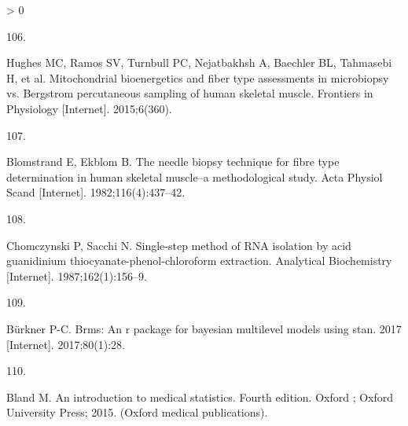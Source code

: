 \documentclass[twoside,10pt]{gihclass} %
\newlength{\cslhangindent}
\newlength{\csllabelwidth}
\newenvironment{CSLReferences}[3] %
 {%
  \setlength{\parindent}{0pt}
  \ifodd #1 \everypar{\setlength{\hangindent}{\cslhangindent}}\ignorespaces\fi
  \ifnum #2 > 0
  \setlength{\parskip}{#2\baselineskip}
  \fi
 }%
 {}
\newcommand{\CSLLeftMargin}[1]{\parbox[t]{\maxof{\widthof{#1}}{\csllabelwidth}}{#1}}
\newcommand{\CSLRightInline}[1]{\parbox[t]{\linewidth}{#1}}
\begin{document}
\begin{CSLReferences}{0}{0}
\leavevmode\hypertarget{ref-RN2552}{}%
\CSLLeftMargin{106. }
\CSLRightInline{Hughes MC, Ramos SV, Turnbull PC, Nejatbakhsh A, Baechler BL, Tahmasebi H, et al. Mitochondrial bioenergetics and fiber type assessments in microbiopsy vs. Bergstrom percutaneous sampling of human skeletal muscle. Frontiers in Physiology {[}Internet{]}. 2015;6(360). }

\leavevmode\hypertarget{ref-RN874}{}%
\CSLLeftMargin{107. }
\CSLRightInline{Blomstrand E, Ekblom B. The needle biopsy technique for fibre type determination in human skeletal muscle--a methodological study. Acta Physiol Scand {[}Internet{]}. 1982;116(4):437--42. }

\leavevmode\hypertarget{ref-RN2672}{}%
\CSLLeftMargin{108. }
\CSLRightInline{Chomczynski P, Sacchi N. Single-step method of RNA isolation by acid guanidinium thiocyanate-phenol-chloroform extraction. Analytical Biochemistry {[}Internet{]}. 1987;162(1):156--9. }

\leavevmode\hypertarget{ref-RN2562}{}%
\CSLLeftMargin{109. }
\CSLRightInline{Bürkner P-C. Brms: An r package for bayesian multilevel models using stan. 2017 {[}Internet{]}. 2017;80(1):28. }

\leavevmode\hypertarget{ref-RN2007}{}%
\CSLLeftMargin{110. }
\CSLRightInline{Bland M. An introduction to medical statistics. Fourth edition. Oxford ; Oxford University Press; 2015. (Oxford medical publications). }

\end{CSLReferences}

\end{document}
